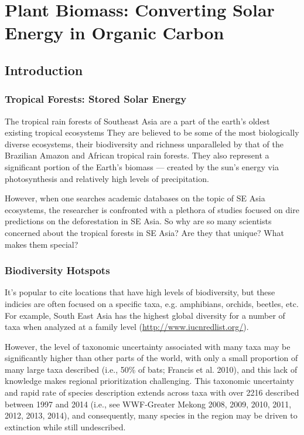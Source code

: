 \chapter{Plant Biomass: Converting Solar Energy in Organic Carbon}

\section{Introduction}

\subsection{Tropical Forests: Stored Solar Energy}

The tropical rain forests of Southeast Asia are a part of the earth's oldest existing tropical ecosystems They are believed to be some of the most biologically diverse ecosystems, their biodiversity and richness unparalleled by that of the Brazilian Amazon and African tropical rain forests. They also represent a significant portion of the Earth's biomass --- created by the sun's energy via photosynthesis and relatively high levels of precipitation.

However, when one searches academic databases on the topic of SE Asia ecosystems, the researcher is confronted with a plethora of studies focused on dire predictions on the deforestation in SE Asia. So why are so many scientists concerned about the tropical forests in SE Asia? Are they that unique?  What makes them special?

\subsection{Biodiversity Hotspots}

It's popular to cite locations that have high levels of biodiversity, but these indicies are often focused on a specific taxa, e.g. amphibians, orchids, beetles, etc. For example, South East Asia has the highest global diversity for a number of taxa when analyzed at a family level (\url{http://www.iucnredlist.org/}). 

However, the level of taxonomic uncertainty associated with many taxa may be significantly higher than other parts of the world, with only a small proportion of many large taxa described (i.e., 50\% of bats; Francis et al. 2010), and this lack of knowledge makes regional prioritization challenging. This taxonomic uncertainty and rapid rate of species description extends across taxa with over 2216 described between 1997 and 2014 (i.e., see WWF‐Greater Mekong 2008, 2009, 2010, 2011, 2012, 2013, 2014), and consequently, many species in the region may be driven to extinction while still undescribed.

